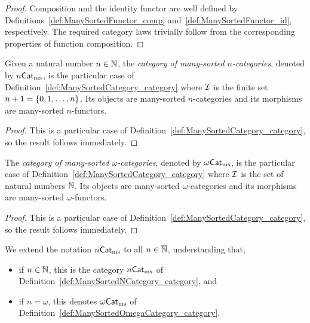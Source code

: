 \begin{proof}
  \leanok
  Composition and the identity functor are well defined by
  Definitions~\ref{def:ManySortedFunctor_comp} and~\ref{def:ManySortedFunctor_id}, respectively. The
  required category laws trivially follow from the corresponding properties of function composition.
\end{proof}

\begin{construction}
  \label{def:ManySortedNCategory_category}
  \leanok
  Given a natural number $n \in \mathbb{N}$, the \emph{category of many-sorted $n$-categories}, denoted by
  $n\mathsf{Cat}_{\mathrm{ms}}$, is the particular case of Definition~\ref{def:ManySortedCategory_category} where
  $\mathcal{I}$ is the finite set $n + 1 = \left\{ 0, 1, \ldots, n \right\}$. Its objects are many-sorted
  $n$-categories and its morphisms are many-sorted $n$-functors.
\end{construction}

\begin{proof}
  \leanok
  This is a particular case of Definition~\ref{def:ManySortedCategory_category}, so the result
  follows immediately.
\end{proof}

\begin{construction}
  \label{def:ManySortedOmegaCategory_category}
  \leanok
  The \emph{category of many-sorted $\omega$-categories}, denoted by $\omega\mathsf{Cat}_{\mathrm{ms}}$, is the
  particular case of Definition~\ref{def:ManySortedCategory_category} where $\mathcal{I}$ is the set of
  natural numbers $\mathbb{N}$. Its objects are many-sorted $\omega$-categories and its morphisms are
  many-sorted $\omega$-functors.
\end{construction}

\begin{proof}
  \leanok
  This is a particular case of Definition~\ref{def:ManySortedCategory_category}, so the result
  follows immediately.
\end{proof}

\begin{notation}
  We extend the notation $n\mathsf{Cat}_{\mathrm{ms}}$ to all $n \in \overline{\mathbb{N}}$, understanding that,
  \begin{itemize}
    \item if $n \in \mathbb{N}$, this is the category $n\mathsf{Cat}_{\mathrm{ms}}$ of
      Definition~\ref{def:ManySortedNCategory_category}, and
    \item if $n = \omega$, this denotes $\omega\mathsf{Cat}_{\mathrm{ms}}$ of
      Definition~\ref{def:ManySortedOmegaCategory_category}.
  \end{itemize}
\end{notation}
